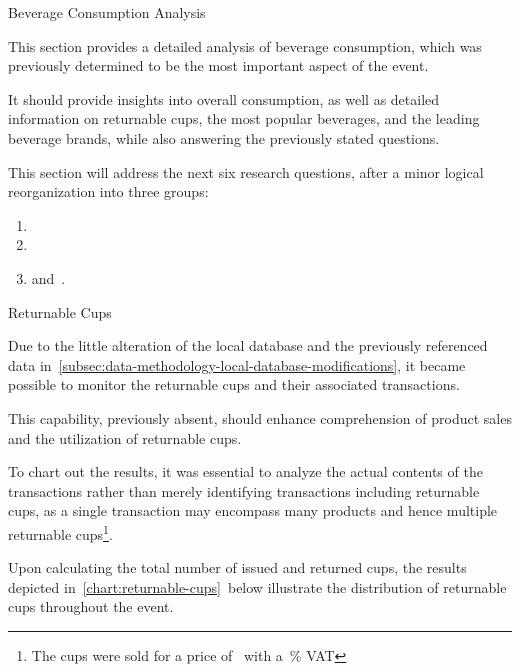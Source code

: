 \begin{section}{Beverage Consumption Analysis}
	\label{sec:analysis-beverage-consumption}

	This section provides a detailed analysis of beverage consumption, which was previously determined to be the most important aspect of the event.

	It should provide insights into overall consumption, as well as detailed information on returnable cups, the most popular beverages, and the leading beverage brands, while also answering the previously stated questions.

	This section will address the next six research questions, after a minor logical reorganization into three groups:
	\begin{enumerate}
		\item {}
		\item {}
		\item and~.
	\end{enumerate}

	\begin{subsection}{Returnable Cups}
		\label{subsec:analysis-beverage-returnable-cups}

		Due to the little alteration of the local database and the previously referenced data in~\autoref{subsec:data-methodology-local-database-modifications}, it became possible to monitor the returnable cups and their associated transactions.

		This capability, previously absent, should enhance comprehension of product sales and the utilization of returnable cups.


		To chart out the results, it was essential to analyze the actual contents of the transactions rather than merely identifying transactions including returnable cups,
		as a single transaction may encompass many products and hence multiple returnable cups\footnote{The cups were sold for a price of~ with a~\% VAT}.

		Upon calculating the total number of issued and returned cups, the results depicted in~\autoref{chart:returnable-cups}~below illustrate the distribution of returnable cups throughout the event.


\end{subsection}
\end{section}
